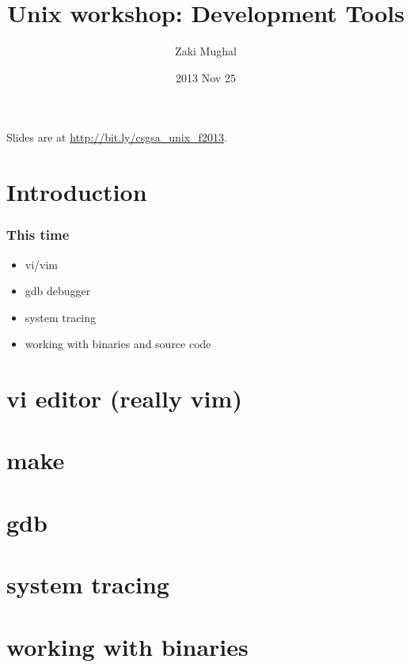 \documentclass[%
        hyperref={%
                pdfauthor={Zakariyya Mughal},%
                pdfpagemode={None},pdfpagelayout={SinglePage}}%
        xcolor={x11names},%
]{beamer}
\title[Unix Scripting]{Unix workshop: Development Tools}
\author{Zaki Mughal}
\institute{Computational Biomedicine Lab\\University of Houston}
\date{2013 Nov 25}
\begin{document}
\frame{\titlepage}
\begin{frame}
	Slides are at \url{http://bit.ly/csgsa_unix_f2013}.
\end{frame}
\section{Introduction}\frame{\insertsection}

\begin{frame}
	\frametitle{This time}
	\begin{itemize}
		\item vi/vim
		\item gdb debugger
		\item system tracing
		\item working with binaries and source code
	\end{itemize}
\end{frame}

\section{vi editor (really vim)}\frame{\insertsection}

\section{make}\frame{\insertsection}

\section{gdb}\frame{\insertsection}


\section{system tracing}\frame{\insertsection}


\section{working with binaries}\frame{\insertsection}
\end{document}
